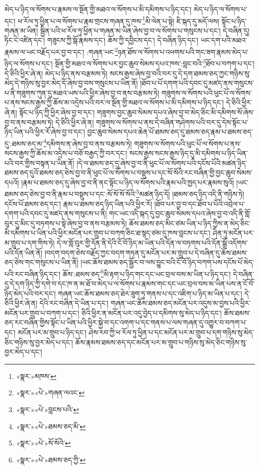 མེད་པ་ཉིད་ལ་སོགས་པ་རྣམས་ལ་སྔོན་གྱི་མཐའ་ལ་སོགས་པ་མི་དམིགས་པ་ཉིད་དང་། མེད་པ་ཉིད་ལ་སོགས་པ་དང་། ཕ་རོལ་ཏུ་ཕྱིན་པ་ལ་སོགས་པ་རྣམ་གྲངས་གཞན་དུ་ཁས་\footnote{«སྣར་»མཁས་}མི་ལེན་པ་སྟེ། ཇི་སྐད་དུ་མདོ་ལས། སྟོང་པ་ཉིད་གཞན་མ་ཡིན། སྦྱིན་པའི་ཕ་རོལ་ཏུ་ཕྱིན་པ་གཞན་མ་ཡིན་ཞེས་བྱ་བ་ལ་སོགས་པ་གསུངས་པ་དང་། དེ་བཞིན་དུ། ཏིང་ངེ་འཛིན་དང་། གཟུངས་ཀྱི་སྒོ་རྣམས་དང་། ཆོས་ཀྱི་དབྱིངས་དང་། དེ་བཞིན་ཉིད་དང་། ཡང་དག་པའི་མཐའ་རྣམས་ལ་ཡང་བརྗོད་པར་བྱ་བ་དང་། :གཞན་ཡང་\footnote{«སྣར་»«པེ་»གཞན་ལའང་}ཉན་ཐོས་ལ་སོགས་པ་འཕགས་པའི་གང་ཟག་རྣམས་མེད་པ་ཉིད་ལ་སོགས་པ་དང་། སྔོན་གྱི་མཐའ་ལ་སོགས་པར་བྱང་ཆུབ་སེམས་དཔའ་ཁས་:བླང་བའི་\footnote{«སྣར་»«པེ་»བླངས་པའི་}ཐོབ་པ་བཀག་པ་དང་། དེ་ཅིའི་ཕྱིར་ཞེ་ན། མེད་པ་ཉིད་ནས་བརྩམས་ཏེ། སངས་རྒྱས་ཞེས་བྱ་བའི་བར་དུ་དེ་དག་ཐམས་ཅད་ཀྱང་གཉིས་སུ་མེད་དེ་གཉིས་སུ་བྱར་མེད་དོ་ཞེས་བྱ་བས་གསུངས་པ་ཡིན་ནོ། །ཐོབ་པ་པོ་དགག་པའི་དབང་དུ་མཛད་ནས་གསུངས་པ་ནི་གཟུགས་ཀུན་དུ་མཐའ་ཡས་པའི་ཕྱིར་ཞེས་བྱ་བ་ནས་བརྩམས་ཏེ། གཟུགས་ལ་སོགས་པའི་ཕུང་པོ་ལ་སོགས་པ་ནས་སངས་རྒྱས་ཀྱི་ཆོས་མ་འདྲེས་པའི་བར་ལ་སྔོན་གྱི་མཐའ་ལ་སོགས་པ་མི་དམིགས་པ་ཉིད་དང་། དེ་ཅིའི་ཕྱིར་ཞེ་ན། སྟོང་པ་ཉིད་ཀྱི་ཕྱིར་ཞེས་བྱ་བ་དང་། གཟུགས་བྱང་ཆུབ་སེམས་དཔའ་ཞེས་བྱ་བ་མེད་ཅིང་མི་དམིགས་སོ་ཞེས་བྱ་བ་ནས་བརྩམས་ཏེ། དེ་ཅིའི་ཕྱིར་ཞེ་ན། གཟུགས་ལ་སོགས་པ་ནས་དེ་བཞིན་གཤེགས་པའི་བར་དུ་དེས་སྟོང་པ་ཉིད་ཡིན་པའི་ཕྱིར་རོ་ཞེས་བྱ་བ་དང་། བྱང་ཆུབ་སེམས་དཔའ་ཆེན་པོ་ཐམས་ཅད་དུ་ཐམས་ཅད་རྣམ་པ་ཐམས་ཅད་དུ་:ཐམས་ཅད་མ་\footnote{«སྣར་»«པེ་»ཐམས་ཅད་མི་}དམིགས་ན་ཞེས་བྱ་བ་ནས་བརྩམས་ཏེ། གཟུགས་ལ་སོགས་པའི་ཕུང་པོ་ལ་སོགས་པ་ནས་སངས་རྒྱས་ཀྱི་ཆོས་མ་འདྲེས་པ་བཅོ་བརྒྱད་ཀྱི་བར་དང་། སངས་རྒྱས་སངས་རྒྱས་ཉིད་དུ་མི་དམིགས་པ་ཉིད་ཡིན་པའི་བར་གྱིས་བསྟན་པ་ཡིན་ནོ། །དེ་ལ་ཐམས་ཅད་དུ་ཞེས་བྱ་བ་ནི་ཕུང་པོ་ལ་སོགས་པའི་དངོས་པོའི་མཚན་ཉིད་ཐམས་ཅད་དུའོ་ཐམས་ཅད་ཅེས་བྱ་བ་ནི་ཕུང་པོ་ལ་སོགས་པ་བསྡུས་པ་དང་སོ་སོའི་རང་བཞིན་གྱི་བྱང་ཆུབ་སེམས་དཔའོ། །རྣམ་པ་ཐམས་ཅད་དུ་ཞེས་བྱ་བ་ནི་ནང་སྟོང་པ་ཉིད་ལ་སོགས་པའི་རྣམ་པའི་ཁྱད་པར་རྣམས་སུའོ། །ཡང་ཐམས་ཅད་ཅེས་བྱ་བ་ནི་རྣམ་པ་བསྡུས་པ་དང་:སོ་སོ་སོ་སོའི་\footnote{«སྣར་»«པེ་»སོ་སོའི་}མཚན་ཉིད་དོ། །ཐམས་ཅད་ཉིད་འདི་ནི་གཉིས་ཏེ། དངོས་པོ་ཐམས་ཅད་དང་། རྣམ་པ་ཐམས་ཅད་ཉིད་ཡིན་པའི་ཕྱིར་རོ། །ཐོབ་པར་བྱ་བ་དང་ཐོབ་པ་པོའི་འབྲེལ་པ་དགག་པའི་དབང་དུ་མཛད་ནས་གསུངས་པ་ནི། གང་ཡང་འདི་སྐད་དུ་བྱང་ཆུབ་སེམས་དཔའ་ཞེས་བྱ་བ་འདི་ནི་གློ་བུར་དུ་མིང་དུ་བཏགས་པ་སྟེ་ཞེས་བྱ་བ་ནས་བརྩམས་ཏེ། ཆོས་ཐམས་ཅད་མིང་ཙམ་ཡིན་པ་ཉིད་ཀྱིས་ན་མེད་ཅིང་མི་དམིགས་པ་ཡིན་པའི་ཕྱིར་མངོན་པར་གྲུབ་པ་བཀག་ཅིང་ཐ་སྙད་ཙམ་དུ་ཁས་བླངས་པ་དང་། ཤིན་ཏུ་མངོན་པར་མ་གྲུབ་པ་དག་གིས་ཏེ། དེ་ལ་གློ་བུར་གྱི་དོན་ནི་དེའི་ངོ་བོ་ཉིད་མ་ཡིན་པའི་དོན་ལ་བཏགས་པའི་དོན་སྒྲོ་འདོགས་པའི་དོན་ཡིན་ནོ། །བདག་བདག་ཅེས་བརྗོད་ཀྱང་བདག་གཏན་དུ་མངོན་པར་མ་གྲུབ་པ་དེ་བཞིན་དུ་ཆོས་ཐམས་ཅད་ཅེས་གང་གསུངས་པ་ཡིན་ནོ། །ཡང་ཆོས་ཐམས་ཅད་སྦྱོར་བ་ལས་བྱུང་བའི་ངོ་བོ་ཉིད་བཀག་པས་དངོས་པོ་མེད་པའི་རང་བཞིན་ཉིད་དང་། ཆོས་:ཐམས་ཅད་\footnote{«སྣར་»«པེ་»ཐམས་ཅད་ཀྱི་}མི་རྟག་པ་ཉིད་གང་དང་ཡང་བྲལ་བས་མ་ཡིན་པ་ཉིད་དང་། དེ་བཞིན་དུ་དེ་དག་ཉིད་ཀྱི་དགེ་བ་དང་ཁ་ན་མ་ཐོ་བ་མེད་པ་ལ་སོགས་པ་རྣམས་གང་དང་ཡང་བྲལ་བས་མ་ཡིན་པས་ན་ངོ་བོ་ཉིད་མེད་པའི་བར་དང་། གཞན་ཡང་ཆོས་ཐམས་ཅད་ཐེར་ཟུག་ཏུ་གནས་པ་དང་འཇིག་པ་ཉིད་མ་ཡིན་པ་དང་། དེ་ཅིའི་ཕྱིར་ཞེ་ན། དེའི་རང་བཞིན་དེ་ཡིན་པ་དང་། གཞན་ཡང་ཆོས་ཐམས་ཅད་མངོན་པར་འདུས་མ་བྱས་པའི་ཕྱིར་མངོན་པར་གྲུབ་པ་བཀག་པ་དང་། ཅིའི་ཕྱིར་ན་མངོན་པར་འདུ་བྱེད་པ་དམིགས་སུ་མེད་པ་ཉིད་དང་། ཆོས་ཐམས་ཅད་རང་བཞིན་གྱིས་སྟོང་པ་ཡིན་པའི་ཕྱིར་སྐྱེ་བ་དང་འགག་པ་དང་གནས་པ་ལས་གཞན་དུ་འགྱུར་བ་བཀག་པ་དང་། མངོན་པར་མ་གྲུབ་པ་ཉིད་དང་། ཤེས་རབ་ཀྱི་ཕ་རོལ་ཏུ་ཕྱིན་པ་དང་མངོན་པར་མ་གྲུབ་པ་དག་གཉིས་སུ་མེད་ཅིང་གཉིས་སུ་བྱར་མེད་པ་དང་། ཆོས་རྣམས་ཐམས་ཅད་དང་མངོན་པར་མ་གྲུབ་པ་གཉིས་སུ་མེད་ཅིང་གཉིས་སུ་བྱར་མེད་པ་དང་། 